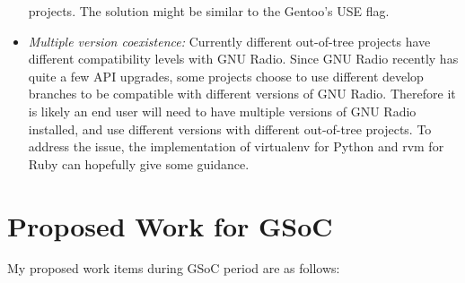 \documentclass[a4paper]{article}
\begin{document}
\begin{itemize}
    projects. The solution might be similar to the Gentoo's USE flag.
  \item \emph{Multiple version coexistence:} Currently different
    out-of-tree projects have different compatibility levels with GNU
    Radio. Since GNU Radio recently has quite a few API upgrades,
    some projects choose to use different develop branches to be
    compatible with different versions of GNU Radio. Therefore it is
    likely an end user will need to have multiple versions of GNU Radio
    installed, and use different versions with different out-of-tree
    projects. To address the issue, the implementation of
    virtualenv for Python and rvm for Ruby can hopefully give some guidance.
\end{itemize}

\section{Proposed Work for GSoC}

My proposed work items during GSoC period are as follows:
\end{document}
